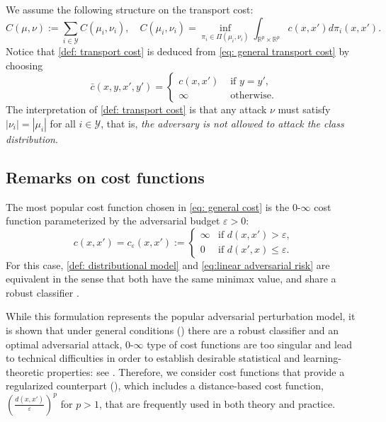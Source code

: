 \documentclass{amsart}
\theoremstyle{plain}
\numberwithin{equation}{section}\newtheorem{theorem}{Theorem}[section]
\theoremstyle{remark}
\begin{document}
We assume the following structure on the transport cost:
\begin{equation}\label{def: transport cost}
    C(\mu, \nu) := \sum_{i \in \mathcal{Y}} C(\mu_i, \nu_i), \quad C(\mu_i, \nu_i) = \inf_{\pi_i \in \Pi(\mu_i, \nu_i)} \int_{\mathbb{R}^p \times \mathbb{R}^p} c(x, x') d\pi_i(x, x').
\end{equation}
Notice that \eqref{def: transport cost} is deduced from \eqref{eq: general transport cost} by choosing
\begin{equation}\label{eq: general cost}
    \bar{c}( x,y, x',y' ) = \begin{cases}
        c(x,x') &\text{ if $y=y'$,}\\
        \infty & \text{ otherwise.}
    \end{cases}
\end{equation}
The interpretation of \eqref{def: transport cost} is that any attack $\nu$ must satisfy $|\nu_i|=|\mu_i|$ for all $i \in \mathcal{Y}$, that is, \emph{the adversary is not allowed to attack the class distribution}.



\subsection{Remarks on cost functions}

The most popular cost function chosen in \eqref{eq: general cost} is the $0$-$\infty$ cost function parameterized by the adversarial budget $\varepsilon > 0$:
\begin{equation}
\label{def:CostEpsilon}
    c(x, x')= c_\varepsilon(x, x') := \begin{cases}
    \infty & \text{if } d(x, x') >\varepsilon, \\
    0 & \text{if } d(x',  x) \leq \varepsilon.
    \end{cases}
\end{equation}
For this case, \eqref{def: distributional model} and \eqref{eq:linear adversarial risk} are equivalent in the sense that both have the same minimax value, and share a robust classifier \cite{pydi2021the, jakwang_2024existence}. 






While this formulation represents the popular adversarial perturbation model, it is shown that under general conditions () there are a robust classifier and an optimal adversarial attack, $0$-$\infty$ type of cost functions are too singular and lead to technical difficulties in order to establish desirable statistical and learning-theoretic properties: see . Therefore, we consider cost functions that provide a regularized counterpart (), which includes a distance-based cost function, $\left( \frac{d(x,x')}{\varepsilon} \right)^{p}$ for $p > 1$, that are frequently used in both theory and practice.
\end{document}
